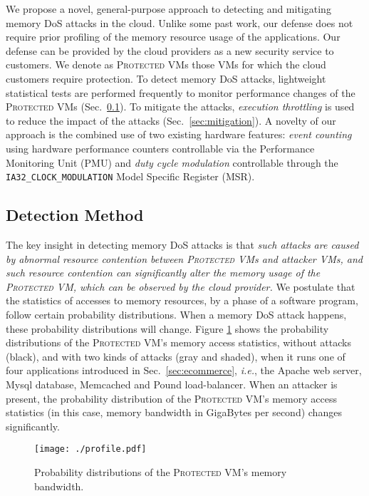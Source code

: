 \documentclass{sig-alternate}
\newcommand{\ie}{\emph{i.e.}\xspace}
\newcommand{\attackname}{memory DoS attacks\xspace}
\newcommand{\aattackname}{memory DoS attack\xspace}
\newcommand{\protectedVM}{\textsc{Protected VM}\xspace}
\newcommand{\secref}[1]{\mbox{Sec.~\ref{#1}}\xspace}
\begin{document}
We propose a novel, general-purpose approach to detecting and mitigating 
\attackname in the cloud. Unlike some past work, our defense does not require prior
profiling of the memory resource usage of the applications. 
Our defense can be provided by the cloud providers as a 
new security service to customers. We denote as \protectedVM{s} those VMs for 
which the cloud customers require protection. To detect \attackname, lightweight 
statistical tests are performed frequently to monitor performance changes of the 
\protectedVM{s} (\secref{sec:detection}). To mitigate the attacks, \emph{execution 
throttling} is used to reduce the impact of the attacks (\secref{sec:mitigation}). 
A novelty of our approach is the 
combined use of two existing hardware features: \textit{event counting} using 
hardware performance counters controllable via the Performance Monitoring Unit 
(PMU) and \textit{duty cycle modulation} controllable through the 
\texttt{IA32\_CLOCK\_MODULATION} Model Specific Register (MSR).

\subsection{Detection Method}
\label{sec:detection}
The key insight in detecting \attackname is that {\em such attacks are caused by
abnormal resource contention between \protectedVM{s} and attacker VMs, and such
resource contention can significantly alter the memory usage of the \protectedVM,
which can be observed by the cloud provider.} We postulate that the
statistics of accesses to memory resources, by a phase of a software program, 
follow certain probability distributions. When a \aattackname happens, these 
probability distributions will change. Figure \ref{fig:prob_dist} shows the 
probability distributions of the \protectedVM's memory access statistics, without 
attacks (black), and with two kinds of attacks (gray and shaded), when it runs one 
of four applications introduced in \secref{sec:ecommerce}, \ie, the Apache web server, 
Mysql database, Memcached and Pound load-balancer. 
When an attacker is present, the probability distribution of the \protectedVM's 
memory access statistics (in this case, memory bandwidth in GigaBytes per second) 
changes significantly.

\begin{figure}[t]
\centerline{\mbox{\texttt{[image: ./profile.pdf]}}}
\caption{Probability distributions of the \protectedVM's memory bandwidth.}
\label{fig:prob_dist}
\end{figure}
\end{document}
